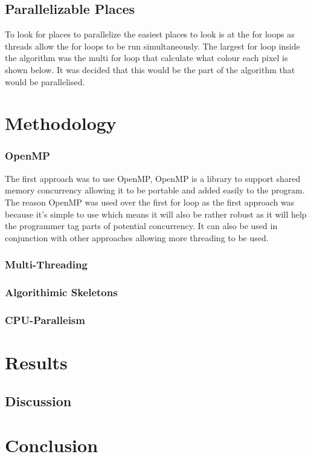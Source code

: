 \documentclass[journal,transmag]{IEEEtran}
\begin{document}
	\subsection{Parallelizable Places}
To look for places to parallelize the easiest places to look is at the for loops as threads allow the for loops to be run simultaneously. The largest for loop inside the algorithm was the multi for loop that calculate what colour each pixel is shown below. It was decided that this would be the part of the algorithm that would be parallelised.
\newpage 

	
\section{Methodology}
	\subsubsection{OpenMP}
	The first approach was to use OpenMP, OpenMP is a library to support shared memory concurrency allowing it to be portable and added easily to the program. The reason OpenMP was used over the first for loop as the first approach was because it’s simple to use which means it will also be rather robust as it will help the programmer tag parts of potential concurrency. It can also be used in conjunction with other approaches allowing more threading to be used.
	\subsubsection{Multi-Threading}
	\subsubsection{Algorithimic Skeletons}
	\subsubsection{CPU-Paralleism}

\section{Results}
	\subsection{Discussion}
	
\section{Conclusion}
	

\newpage




\end{document}
